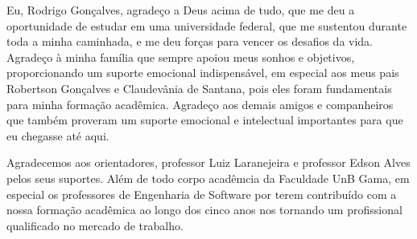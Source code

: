 \begin{agradecimentos}
Eu, Rodrigo Gonçalves, agradeço a Deus acima de tudo, que me deu a oportunidade de estudar em uma universidade federal, que me sustentou durante toda a minha caminhada, e me deu forças para vencer os desafios da vida. Agradeço à minha família que sempre apoiou meus sonhos e objetivos, proporcionando um suporte emocional indispensável, em especial aos meus pais Robertson Gonçalves e Claudevânia de Santana, pois eles foram fundamentais para minha formação acadêmica. Agradeço aos demais amigos e companheiros que também proveram um suporte emocional e intelectual importantes para que eu chegasse até aqui.

Agradecemos aos orientadores, professor Luiz Laranejeira e professor Edson Alves pelos seus suportes. Além de todo corpo acadêmcia da Faculdade UnB Gama, em especial os professores de Engenharia de Software por terem contribuído com a nossa formação acadêmica ao longo dos cinco anos nos tornando um profissional qualificado no mercado de trabalho.
\end{agradecimentos}
